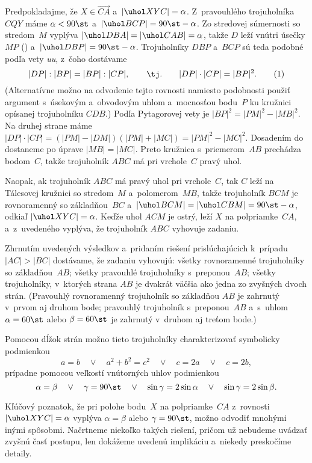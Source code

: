 {Predpokladajme, že $X\in \overrightarrow{CA}$ a~$|\uhol XYC|=\alpha$. Z~pravouhlého trojuholníka $CQY$ máme  ${\alpha<90\st}$ a~$|\uhol BCP|=90\st-\alpha$. Zo stredovej súmernosti so stredom~$M$ vyplýva $|\uhol DBA|=|\uhol CAB|=\alpha$, takže $D$ leží vnútri úsečky $MP$ (\obr) a~$|\uhol DBP|=90\st-\alpha$. Trojuholníky $DBP$ a~$BCP$ sú teda podobné podľa vety {\it uu}, z~čoho dostávame
$$
|DP|:|BP|=|BP|:|CP|,\qquad\text{\tj.}\qquad|DP|\cdot|CP|=|BP|^2.
\tag1
$$
(Alternatívne možno na odvodenie tejto rovnosti namiesto podobnosti použiť argument s~úsekovým a~obvodovým uhlom a~mocnosťou bodu~$P$ ku kružnici opísanej trojuholníku $CDB$.) Podľa Pytagorovej vety je $|BP|^2=|PM|^2-|MB|^2$. Na druhej strane máme $|DP|\cdot|CP|=(|PM|-|DM|)(|PM|+|MC|)=|PM|^2-|MC|^2$. Dosadením do  dostaneme po úprave $|MB|=|MC|$. Preto kružnica s~priemerom~$AB$ prechádza bodom~$C$, takže trojuholník $ABC$ má pri vrchole~$C$ pravý uhol.

Naopak, ak trojuholník $ABC$ má pravý uhol pri vrchole~$C$, tak $C$ leží na Tálesovej kružnici so stredom~$M$ a~polomerom~$MB$, takže trojuholník $BCM$ je rovnoramenný so základňou~$BC$ a~$|\uhol BCM|=|\uhol CBM|=90\st-\alpha$, odkiaľ $|\uhol XYC|=\alpha$. Keďže uhol $ACM$ je ostrý, leží $X$ na polpriamke~$CA$, a~z~uvedeného vyplýva, že trojuholník $ABC$ vyhovuje zadaniu.

\zaver
Zhrnutím uvedených výsledkov a~pridaním riešení prislúchajúcich k~prípadu $|AC|>|BC|$ dostávame, že zadaniu vyhovujú:
\ite{$\bullet$} všetky rovnoramenné trojuholníky so základňou~$AB$;
\ite{$\bullet$} všetky pravouhlé trojuholníky s~preponou~$AB$;
\ite{$\bullet$} všetky trojuholníky, v~ktorých strana $AB$ je dvakrát väčšia ako jedna zo zvyšných dvoch strán.\endgraf\noindent
(Pravouhlý rovnoramenný trojuholník so základňou $AB$ je zahrnutý v~prvom aj druhom bode; pravouhlý trojuholník s~preponou~$AB$ a~s~uhlom $\alpha=60\st$ alebo $\beta=60\st$ je zahrnutý v~druhom aj treťom bode.)

Pomocou dĺžok strán možno tieto trojuholníky charakterizovať symbolicky podmienkou
$$
a=b \quad\vee\quad  a^2+b^2=c^2 \quad\vee\quad c=2a \quad\vee\quad c=2b,
$$
prípadne pomocou veľkostí vnútorných uhlov podmienkou
$$
\alpha=\beta \quad\vee\quad  \gamma=90\st \quad\vee\quad \sin\gamma=2\sin\alpha \quad\vee\quad \sin\gamma=2\sin\beta.
$$

\poznamka
Kľúčový poznatok, že pri polohe bodu~$X$ na polpriamke~$CA$ z~rovnosti $|\uhol XYC|=\alpha$ vyplýva $\alpha=\beta$ alebo $\gamma=90\st$, možno odvodiť mnohými inými spôsobmi. Načrtneme niekoľko takých riešení, pričom už nebudeme uvádzať zvyšnú časť postupu, len dokážeme uvedenú implikáciu a~niekedy preskočíme detaily.

}
